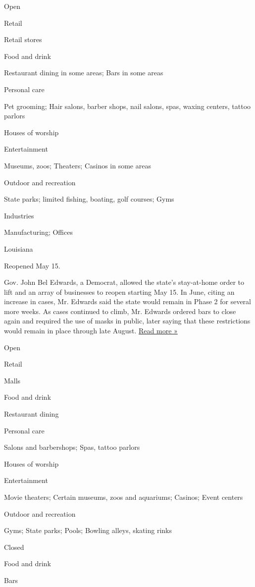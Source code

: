 Open

Retail

Retail stores

Food and drink

Restaurant dining in some areas; Bars in some areas

Personal care

Pet grooming; Hair salons, barber shops, nail salons, spas, waxing
centers, tattoo parlors

Houses of worship

Entertainment

Museums, zoos; Theaters; Casinos in some areas

Outdoor and recreation

State parks; limited fishing, boating, golf courses; Gyms

Industries

Manufacturing; Offices

Louisiana

Reopened May 15.

Gov. John Bel Edwards, a Democrat, allowed the state's stay-at-home
order to lift and an array of businesses to reopen starting May 15. In
June, citing an increase in cases, Mr. Edwards said the state would
remain in Phase 2 for several more weeks. As cases continued to climb,
Mr. Edwards ordered bars to close again and required the use of masks in
public, later saying that these restrictions would remain in place
through late August.
\href{https://www.wdsu.com/article/watch-live-gov-edwards-providing-biweekly-covid-19-update/33513056}{Read
more »}

Open

Retail

Malls

Food and drink

Restaurant dining

Personal care

Salons and barbershops; Spas, tattoo parlors

Houses of worship

Entertainment

Movie theaters; Certain museums, zoos and aquariums; Casinos; Event
centers

Outdoor and recreation

Gyms; State parks; Pools; Bowling alleys, skating rinks

Closed

Food and drink

Bars

